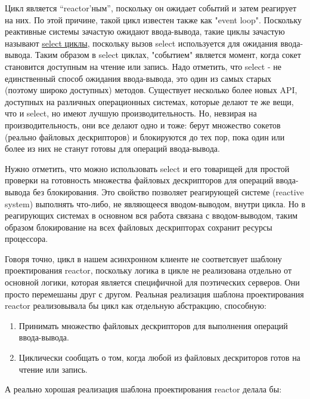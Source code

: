 \eject

Цикл является “reactor'ным”, поскольку он ожидает событий 
и затем реагирует на них. По этой причине, такой цикл 
известен также как "event loop". Поскольку реактивные 
системы зачастую ожидают ввода-вывода, такие циклы зачастую 
называют 
\href{http://en.wikipedia.org/wiki/Asynchronous\_I/O#Select.28.2Fpoll.29\_loops}{select циклы}, 
поскольку вызов select используется для ожидания ввода-вывода. 
Таким образом в select циклах, "событием" является момент, когда 
сокет становится доступным на чтение или запись. Надо отметить, что 
select - не единственный способ ожидания ввода-вывода, это один 
из самых старых (поэтому широко доступных) методов. Существует несколько 
более новых API, доступных на различных операционных системах, 
которые делают те же вещи, что и select, но имеют лучшую 
производительность. Но, невзирая на производительность, они все делают 
одно и тоже: берут множество сокетов (реально файловых дескрипторов) и 
блокируются до тех пор, пока один или более из них не станут готовы для 
операций ввода-вывода.  


Нужно отметить, что можно использовать select и его 
товарищей для простой проверки на готовность множества 
файловых дескрипторов для операций ввода-вывода без 
блокирования. Это свойство позволяет реагирующей системе (reactive system) 
выполнять что-либо, не являющееся вводом-выводом, 
внутри цикла. Но в реагирующих системах в основном вся работа 
связана с вводом-выводом, таким образом блокирование на 
всех файловых дескрипторах сохранит ресурсы процессора.


Говоря точно, цикл в нашем асинхронном клиенте не соответсвует 
шаблону проектирования reactor, поскольку логика в цикле не 
реализована отдельно от основной логики, которая является 
специфичной для поэтических серверов. Они просто перемешаны 
друг с другом. Реальная реализация шаблона проектирования reactor 
реализовывала бы цикл как отдельную абстракцию, способную:

\begin{enumerate}

\item Принимать множество файловых дескрипторов для выполнения 
операций ввода-вывода.

\item Циклически сообщать о том, когда любой из файловых дескриторов 
готов на чтение или запись. 

\end{enumerate}


А реально хорошая реализация шаблона проектирования reactor 
делала бы:


